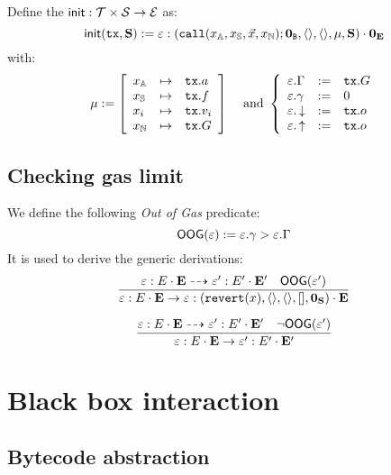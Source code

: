 \documentclass[14pt]{extarticle}
\begin{document}
Define the $\mathsf{init}: \mathcal{T}\times \mathcal{S} \to \mathcal{E}$ as:
$$
\mathsf{init}(\mathtt{tx}, \mathbf{S}) :=  \varepsilon:(\mathtt{call}(x_{\mathbb{A}},x_{\mathbb{S}},\vec x, x_{\mathbb{N}});\mathbf{0}_{\mathtt{B}},\langle\rangle,\langle\rangle,\mu,\mathbf{S})\cdot \mathbf{0}_{\mathbf{E}}
$$ 
with:
$$
\begin{array}{cc}
\mu := \left[ 
    \begin{array}{lll}
    x_{\mathbb{A}} & \mapsto & \mathtt{tx}.a \\
    x_{\mathbb{S}} & \mapsto & \mathtt{tx}.f \\
    x_i &\mapsto& \mathtt{tx}.v_i \\
    x_{\mathbb{N}} & \mapsto & \mathtt{tx}.G \\
    \end{array}\right] 
& \hbox{ and }
\left\{
\begin{array}{lll}
    \varepsilon.\Gamma &:=&\mathtt{tx}.G \\
    \varepsilon.\gamma &:=& 0 \\
    \varepsilon.\mathop{\downarrow}&:=&\mathtt{tx}.o \\ 
    \varepsilon.\mathop{\uparrow}&:=&\mathtt{tx}.o 
\end{array}
\right.
\end{array}
$$

\subsection{Checking gas limit}
We define the following \emph{Out of Gas} predicate:
$$
\mathsf{OOG}(\varepsilon) := \varepsilon.\gamma > \varepsilon.\Gamma 
$$
It is used to derive the generic derivations:
\begin{equation}
\dfrac{
\varepsilon:E\cdot\mathbf{E}\dashrightarrow \varepsilon':E'\cdot\mathbf{E}' \quad \mathsf{OOG}(\varepsilon')
}{
\varepsilon:E\cdot\mathbf{E}\to \varepsilon: (\mathtt{revert}(x),\langle\rangle,\langle\rangle,[],\mathbf{0}_{\mathbf{S}})\cdot\mathbf{E}
}
\end{equation}

\begin{equation}
\dfrac{
\varepsilon:E\cdot\mathbf{E}\dashrightarrow \varepsilon':E'\cdot\mathbf{E}' \quad \neg\mathsf{OOG}(\varepsilon')
}{
\varepsilon:E\cdot\mathbf{E}\to \varepsilon':E'\cdot\mathbf{E}'
}
\end{equation}

\newpage 

\newpage

\newpage

\newpage


\section{Black box interaction}

\subsection{Bytecode abstraction}
\def\aByt{{\Byt^\sharp}}
\def\burn{\dagger}
\end{document}
